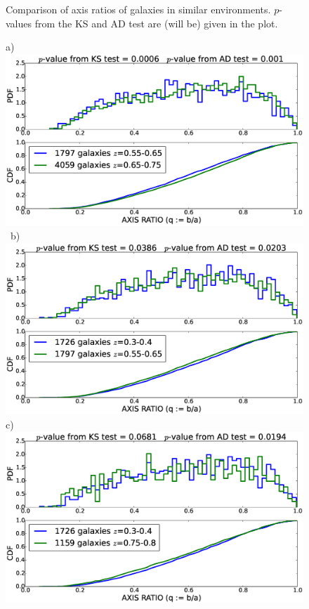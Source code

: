 \documentclass[twocolumn,useAMS,usenatbib]{mn2e}
\begin{document}
\begin{figure}
 \caption{Comparison of axis ratios of galaxies in similar environments. $p$-values from the KS and AD test are (will be) given in the plot.}
 \label{fig:axisratio_similar}
\end{figure}

\begin{figure}
 \centering
 a) \includegraphics[width=0.9\columnwidth]{axisratio(0)_0dot55-0dot65_0dot65-0dot75.eps} \
 b) \includegraphics[width=0.9\columnwidth]{axisratio(0)_0dot3-0dot4_0dot55-0dot65.eps} \\
 c) \includegraphics[width=0.9\columnwidth]{axisratio(0)_0dot3-0dot4_0dot75-0dot8.eps} \

\end{figure}
\end{document}
